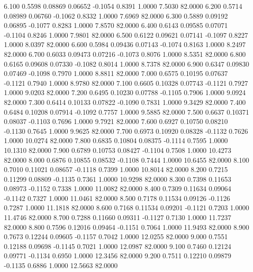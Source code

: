    6.100   0.5598   0.08869   0.06652  -0.1054   0.8391   1.0000   7.5030  82.0000
   6.200   0.5714   0.08989   0.06760  -0.1062   0.8332   1.0000   7.6969  82.0000
   6.300   0.5889   0.09192   0.06895  -0.1077   0.8283   1.0000   7.8570  82.0000
   6.400   0.6143   0.09585   0.07071  -0.1104   0.8246   1.0000   7.9801  82.0000
   6.500   0.6122   0.09621   0.07141  -0.1097   0.8227   1.0000   8.0397  82.0000
   6.600   0.5984   0.09436   0.07143  -0.1074   0.8163   1.0000   8.2497  82.0000
   6.700   0.6033   0.09473   0.07216  -0.1073   0.8076   1.0000   8.5351  82.0000
   6.800   0.6165   0.09608   0.07330  -0.1082   0.8014   1.0000   8.7378  82.0000
   6.900   0.6347   0.09830   0.07469  -0.1098   0.7970   1.0000   8.8811  82.0000
   7.000   0.6575   0.10195   0.07637  -0.1121   0.7940   1.0000   8.9780  82.0000
   7.100   0.6605   0.10328   0.07743  -0.1121   0.7927   1.0000   9.0203  82.0000
   7.200   0.6495   0.10230   0.07788  -0.1105   0.7906   1.0000   9.0924  82.0000
   7.300   0.6414   0.10133   0.07822  -0.1090   0.7831   1.0000   9.3429  82.0000
   7.400   0.6484   0.10208   0.07914  -0.1092   0.7757   1.0000   9.5885  82.0000
   7.500   0.6637   0.10371   0.08037  -0.1103   0.7696   1.0000   9.7921  82.0000
   7.600   0.6927   0.10750   0.08210  -0.1130   0.7645   1.0000   9.9625  82.0000
   7.700   0.6973   0.10920   0.08328  -0.1132   0.7626   1.0000  10.0274  82.0000
   7.800   0.6835   0.10804   0.08375  -0.1114   0.7595   1.0000  10.1310  82.0000
   7.900   0.6789   0.10753   0.08427  -0.1104   0.7508   1.0000  10.4273  82.0000
   8.000   0.6876   0.10855   0.08532  -0.1108   0.7444   1.0000  10.6455  82.0000
   8.100   0.7010   0.11021   0.08657  -0.1118   0.7399   1.0000  10.8014  82.0000
   8.200   0.7215   0.11299   0.08809  -0.1135   0.7361   1.0000  10.9298  82.0000
   8.300   0.7398   0.11653   0.08973  -0.1152   0.7338   1.0000  11.0082  82.0000
   8.400   0.7309   0.11634   0.09064  -0.1142   0.7327   1.0000  11.0461  82.0000
   8.500   0.7178   0.11534   0.09126  -0.1126   0.7287   1.0000  11.1818  82.0000
   8.600   0.7168   0.11534   0.09201  -0.1121   0.7203   1.0000  11.4746  82.0000
   8.700   0.7288   0.11660   0.09311  -0.1127   0.7130   1.0000  11.7237  82.0000
   8.800   0.7596   0.12016   0.09464  -0.1151   0.7064   1.0000  11.9493  82.0000
   8.900   0.7673   0.12244   0.09605  -0.1157   0.7042   1.0000  12.0255  82.0000
   9.000   0.7551   0.12188   0.09698  -0.1145   0.7021   1.0000  12.0987  82.0000
   9.100   0.7460   0.12124   0.09771  -0.1134   0.6950   1.0000  12.3456  82.0000
   9.200   0.7511   0.12210   0.09879  -0.1135   0.6886   1.0000  12.5663  82.0000
